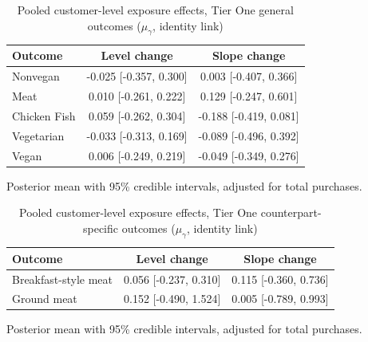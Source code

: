 
\begin{table}[H]
\centering
\caption{Pooled customer-level exposure effects, Tier One general outcomes ($\mu_\gamma$, identity link)}
\label{tab:a5_mu_gamma}
\begin{tabular}{lcc}
\toprule
Outcome & Level change & Slope change \\
\midrule
Nonvegan & -0.025 [-0.357, 0.300] & 0.003 [-0.407, 0.366] \\
Meat & 0.010 [-0.261, 0.222] & 0.129 [-0.247, 0.601] \\
Chicken Fish & 0.059 [-0.262, 0.304] & -0.188 [-0.419, 0.081] \\
Vegetarian & -0.033 [-0.313, 0.169] & -0.089 [-0.496, 0.392] \\
Vegan & 0.006 [-0.249, 0.219] & -0.049 [-0.349, 0.276] \\
\bottomrule
\end{tabular}
\par\smallskip\footnotesize Posterior mean with 95\% credible intervals, adjusted for total purchases.
\end{table}

\begin{table}[H]
\centering
\caption{Pooled customer-level exposure effects, Tier One counterpart-specific outcomes ($\mu_\gamma$, identity link)}
\label{tab:a6_mu_gamma}
\begin{tabular}{lcc}
\toprule
Outcome & Level change & Slope change \\
\midrule
Breakfast-style meat & 0.056 [-0.237, 0.310] & 0.115 [-0.360, 0.736] \\
Ground meat & 0.152 [-0.490, 1.524] & 0.005 [-0.789, 0.993] \\
\bottomrule
\end{tabular}
\par\smallskip\footnotesize Posterior mean with 95\% credible intervals, adjusted for total purchases.
\end{table}

